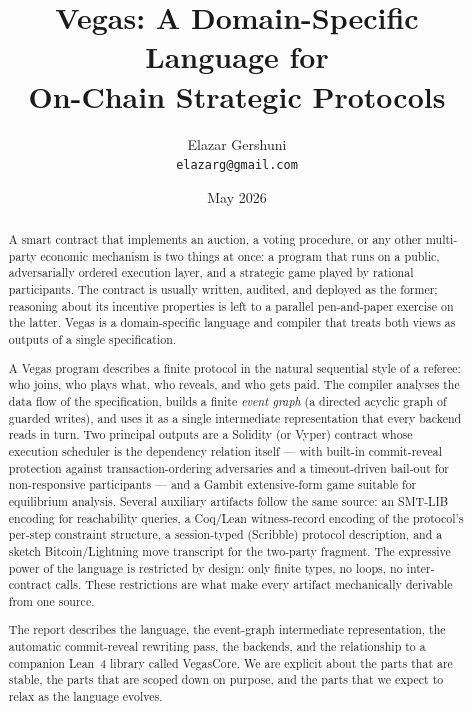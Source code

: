 \documentclass[11pt]{article}
\title{Vegas: A Domain-Specific Language for\\
       On-Chain Strategic Protocols}
\author{Elazar Gershuni\\\texttt{elazarg@gmail.com}}
\date{May 2026}
\begin{document}
\maketitle

\begin{abstract}
A smart contract that implements an auction, a voting procedure, or
any other multi-party economic mechanism is two things at once: a
program that runs on a public, adversarially ordered execution layer,
and a strategic game played by rational participants.  The contract
is usually written, audited, and deployed as the former; reasoning
about its incentive properties is left to a parallel pen-and-paper
exercise on the latter.  Vegas is a domain-specific language and
compiler that treats both views as outputs of a single specification.

A Vegas program describes a finite protocol in the natural
sequential style of a referee: who joins, who plays what, who
reveals, and who gets paid.  The compiler analyses the data flow
of the specification, builds a finite \emph{event graph} (a
directed acyclic graph of guarded writes), and uses it as a
single intermediate representation that every backend reads in
turn.  Two principal outputs are a Solidity (or Vyper) contract
whose execution scheduler is the dependency relation itself
--- with built-in commit-reveal protection against
transaction-ordering adversaries and a timeout-driven bail-out
for non-responsive participants --- and a Gambit extensive-form
game suitable for equilibrium analysis.  Several auxiliary
artifacts follow the same source: an SMT-LIB encoding for
reachability queries, a Coq/Lean witness-record encoding of the
protocol's per-step constraint structure, a session-typed
(Scribble) protocol description, and a sketch Bitcoin/Lightning
move transcript for the two-party fragment.  The expressive
power of the language is restricted by design: only finite
types, no loops, no inter-contract calls.  These restrictions
are what make every artifact mechanically derivable from one
source.

The report describes the language, the event-graph intermediate
representation, the automatic commit-reveal rewriting pass, the
backends, and the relationship to a companion Lean~4 library called
VegasCore.  We are explicit about the parts that are stable, the
parts that are scoped down on purpose, and the parts that we expect
to relax as the language evolves.
\end{abstract}

\tableofcontents
















\end{document}
